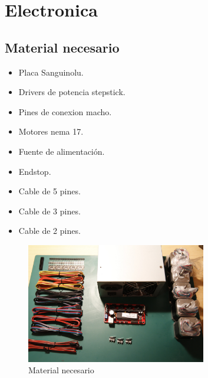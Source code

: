 
\section{Electronica}
	\subsection{Material necesario}
		\begin{itemize}
			\item Placa Sanguinolu.
			\item Drivers de potencia stepstick.
			\item Pines de conexion macho.
			\item Motores nema 17.
			\item Fuente de alimentación.
			\item Endstop.
			\item Cable de 5 pines.
			\item Cable de 3 pines.
			\item Cable de 2 pines.
		\end{itemize}
		\begin{figure}[!htp]
			\centering
			\includegraphics[width=0.7\textwidth]{../../Fotos/2.jpg}
			\caption{Material necesario}
		\end{figure}
		\newpage{}
